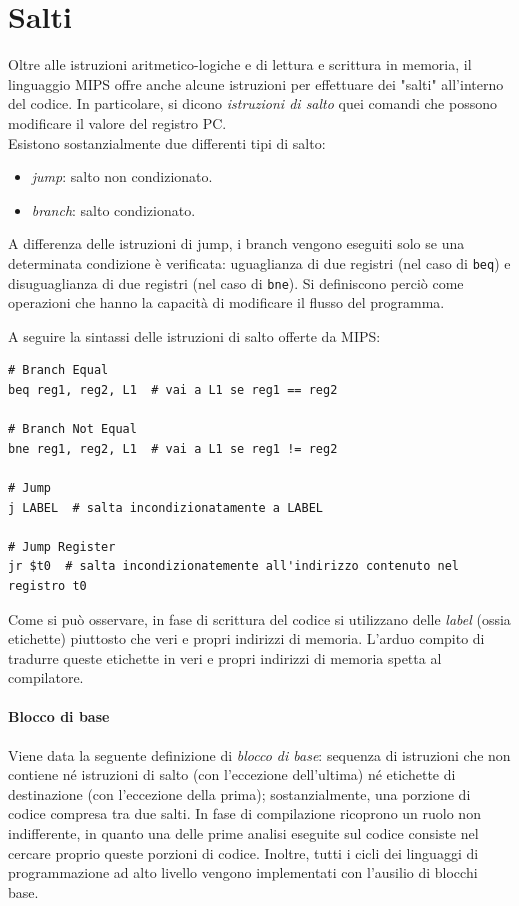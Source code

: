 \documentclass[class=book, crop=false, oneside]{standalone}
\begin{document}
\section{Salti}
Oltre alle istruzioni aritmetico-logiche e di lettura e scrittura in memoria, il linguaggio MIPS offre anche alcune istruzioni per effettuare dei "salti" all'interno del codice. In particolare, si dicono \emph{istruzioni di salto} quei comandi che possono modificare il valore del registro PC.\\
Esistono sostanzialmente due differenti tipi di salto:
\begin{itemize}
	\item \emph{jump}: salto non condizionato.
	\item \emph{branch}: salto condizionato.
\end{itemize}
A differenza delle istruzioni di jump, i branch vengono eseguiti solo se una determinata condizione è verificata: uguaglianza di due registri (nel caso di \texttt{beq}) e disuguaglianza di due registri (nel caso di \texttt{bne}). Si definiscono perciò come operazioni che hanno la capacità di modificare il flusso del programma.

A seguire la sintassi delle istruzioni di salto offerte da MIPS:
\begin{verbatim}
# Branch Equal
beq reg1, reg2, L1  # vai a L1 se reg1 == reg2

# Branch Not Equal
bne reg1, reg2, L1  # vai a L1 se reg1 != reg2

# Jump
j LABEL  # salta incondizionatamente a LABEL

# Jump Register
jr $t0  # salta incondizionatemente all'indirizzo contenuto nel registro t0
\end{verbatim}

Come si può osservare, in fase di scrittura del codice si utilizzano delle \emph{label} (ossia etichette) piuttosto che veri e propri indirizzi di memoria. L'arduo compito di tradurre queste etichette in veri e propri indirizzi di memoria spetta al compilatore.

\paragraph*{Blocco di base} Viene data la seguente definizione di \emph{blocco di base}: sequenza di istruzioni che non contiene né istruzioni di salto (con l’eccezione dell’ultima) né etichette di destinazione (con l’eccezione della prima); sostanzialmente, una porzione di codice compresa tra due salti. In fase di compilazione ricoprono un ruolo non indifferente, in quanto una delle prime analisi eseguite sul codice consiste nel cercare proprio queste porzioni di codice. Inoltre, tutti i cicli dei linguaggi di programmazione ad alto livello vengono implementati con l'ausilio di blocchi base.
\end{document}
